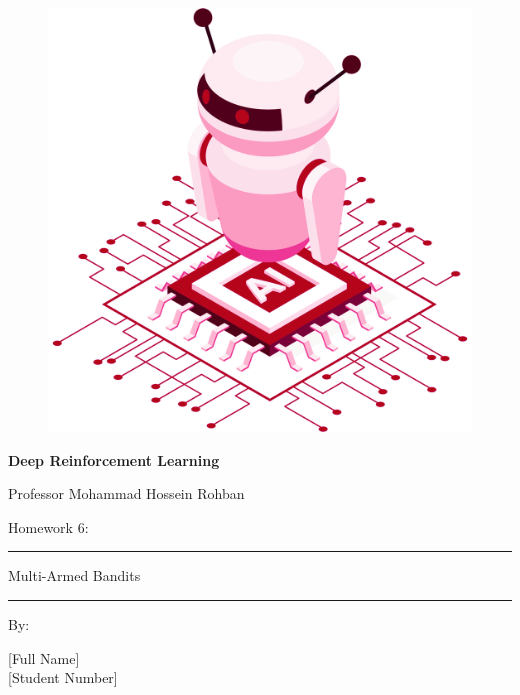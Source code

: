 \documentclass[12pt]{article}
\begin{document}
\thispagestyle{plain}

\begin{center}

\vspace*{-1.5cm}
\begin{figure}[!h]
    \centering
    \includegraphics[width=0.7\linewidth]{figs/cover-std.png}
\end{figure}

{

{\color{DarkBlue} {\fontsize{30}{50} \textbf{
Deep Reinforcement Learning
}}}

{\color{DarkBlue} {\Large
Professor Mohammad Hossein Rohban
}}
}


\vspace{20pt}

{


{\color{RedOrange}
{\Large
Homework 6:
}\\
}
{\color{BrickRed}
\rule{12cm}{0.5pt}

{\Huge
Multi-Armed Bandits
}
\rule{12cm}{0.5pt}
}

\vspace{10pt}

{\color{RoyalPurple} { \small By:} } \\
\vspace{10pt}

{\color{Blue} { \LARGE [Full Name] } } \\
\vspace{5pt}
{\color{RoyalBlue} { \Large [Student Number] } }


}
\end{center}
\end{document}
